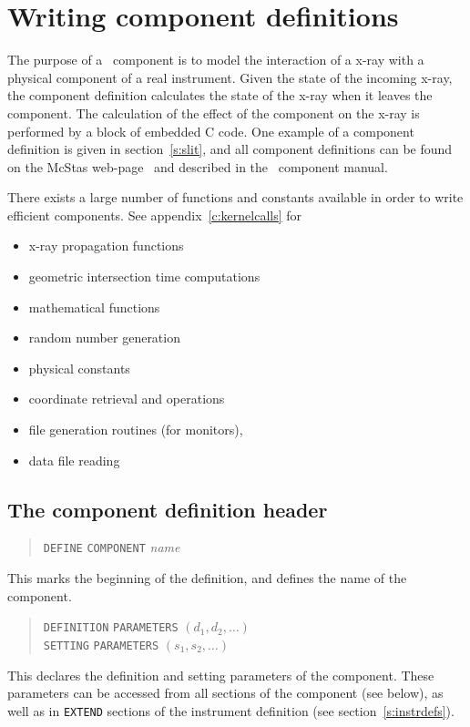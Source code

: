 
\section{Writing component definitions}
\label{s:compdefs}

The purpose of a \MCX\ component is to model the interaction of a
x-ray with a physical component of a real instrument. Given the
state of the incoming x-ray, the
component definition calculates the state of the x-ray when it leaves
the component.  The calculation of the effect of the component on the
x-ray is performed by a block of embedded C code.
One example of a component definition is given in section~\ref{s:slit}, and all
component definitions can be found on the McStas
web-page~\cite{mcxtrace_webpage} and described in the \MCX\ component manual.

There exists a large number of functions and constants available in
order to write efficient components. See appendix~\ref{c:kernelcalls}
for
\begin{itemize}
\item x-ray propagation functions
\item geometric intersection time computations
\item mathematical functions
\item random number generation
\item physical constants
\item coordinate retrieval and operations
\item file generation routines (for monitors),
\item data file reading
\end{itemize}



\subsection{The component definition header}
\label{s:comp-header}

\begin{quote}
  \texttt{DEFINE} \texttt{COMPONENT} \textit{name}
\end{quote}
This marks the beginning of the definition, and defines the name of the
component.
\begin{quote}
  \texttt{DEFINITION} \texttt{PARAMETERS} $(d_1, d_2, \ldots)$ \\
  \texttt{SETTING} \texttt{PARAMETERS} $(s_1, s_2, \ldots)$
\end{quote}
This declares the definition and setting parameters of the component.
These parameters can be
accessed from all sections of the component (see below),
as well as in \verb+EXTEND+ sections of the instrument definition (see section~\ref{s:instrdefs}).

